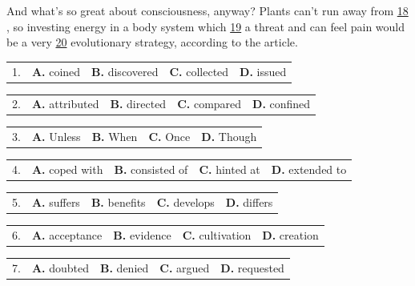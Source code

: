 \documentclass[UTF8,11pt]{ctexart}
\begin{document}
And what’s so great about consciousness, anyway? Plants can’t run away from \uline{18 }, so investing energy in a body system which \uline{19} a threat and can feel pain would be a very \uline{20} evolutionary strategy, according to the article.


\noindent\begin{tabularx}{\linewidth}{@{}lXXXX@{}}1. & \textbf{A.} coined & \textbf{B.} discovered & \textbf{C.} collected & \textbf{D.} issued\\\end{tabularx}\par

\noindent\begin{tabularx}{\linewidth}{@{}lXXXX@{}}2. & \textbf{A.} attributed & \textbf{B.} directed & \textbf{C.} compared & \textbf{D.} confined\\\end{tabularx}\par

\noindent\begin{tabularx}{\linewidth}{@{}lXXXX@{}}3. & \textbf{A.} Unless & \textbf{B.} When & \textbf{C.} Once & \textbf{D.} Though\\\end{tabularx}\par

\noindent\begin{tabularx}{\linewidth}{@{}lXXXX@{}}4. & \textbf{A.} coped with & \textbf{B.} consisted of & \textbf{C.} hinted at & \textbf{D.} extended to\\\end{tabularx}\par

\noindent\begin{tabularx}{\linewidth}{@{}lXXXX@{}}5. & \textbf{A.} suffers & \textbf{B.} benefits & \textbf{C.} develops & \textbf{D.} differs\\\end{tabularx}\par

\noindent\begin{tabularx}{\linewidth}{@{}lXXXX@{}}6. & \textbf{A.} acceptance & \textbf{B.} evidence & \textbf{C.} cultivation & \textbf{D.} creation\\\end{tabularx}\par

\noindent\begin{tabularx}{\linewidth}{@{}lXXXX@{}}7. & \textbf{A.} doubted & \textbf{B.} denied & \textbf{C.} argued & \textbf{D.} requested\\\end{tabularx}\par
\end{document}
